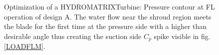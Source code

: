 \begin{figure}[h!]
\begin{minipage}[b]{1\linewidth}
 \centering
\end{minipage}
\caption{Optimization of a HYDROMATRIX\circledR Turbine: Pressure contour at FL operation of design A. The water flow near the shroud region meets the blade for the first time at the pressure side with a higher than desirable angle thus creating the suction side $C_p$ spike visible in fig. \ref{LOADFLM}. }
\label{design-FL-M}
\end{figure}


